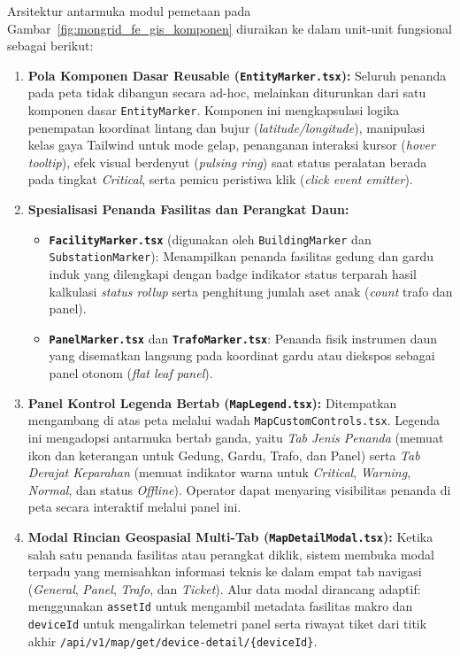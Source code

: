 Arsitektur antarmuka modul pemetaan pada Gambar~\ref{fig:mongrid_fe_gis_komponen} diuraikan ke dalam unit-unit fungsional sebagai berikut:
\begin{enumerate}[label=\arabic*., leftmargin=*, itemsep=0pt]
  \item \textbf{Pola Komponen Dasar Reusable (\texttt{EntityMarker.tsx}):} Seluruh penanda pada peta tidak dibangun secara ad-hoc, melainkan diturunkan dari satu komponen dasar \texttt{EntityMarker}. Komponen ini mengkapsulasi logika penempatan koordinat lintang dan bujur (\textit{latitude/longitude}), manipulasi kelas gaya Tailwind untuk mode gelap, penanganan interaksi kursor (\textit{hover tooltip}), efek visual berdenyut (\textit{pulsing ring}) saat status peralatan berada pada tingkat \textit{Critical}, serta pemicu peristiwa klik (\textit{click event emitter}).
  \item \textbf{Spesialisasi Penanda Fasilitas dan Perangkat Daun:} 
  \begin{itemize}[leftmargin=*, itemsep=0pt]
    \item \textbf{\texttt{FacilityMarker.tsx}} (digunakan oleh \texttt{BuildingMarker} dan \texttt{SubstationMarker}): Menampilkan penanda fasilitas gedung dan gardu induk yang dilengkapi dengan badge indikator status terparah hasil kalkulasi \textit{status rollup} serta penghitung jumlah aset anak (\textit{count} trafo dan panel).
    \item \textbf{\texttt{PanelMarker.tsx}} dan \textbf{\texttt{TrafoMarker.tsx}}: Penanda fisik instrumen daun yang disematkan langsung pada koordinat gardu atau diekspos sebagai panel otonom (\textit{flat leaf panel}).
  \end{itemize}
  \item \textbf{Panel Kontrol Legenda Bertab (\texttt{MapLegend.tsx}):} Ditempatkan mengambang di atas peta melalui wadah \texttt{MapCustomControls.tsx}. Legenda ini mengadopsi antarmuka bertab ganda, yaitu \textit{Tab Jenis Penanda} (memuat ikon dan keterangan untuk Gedung, Gardu, Trafo, dan Panel) serta \textit{Tab Derajat Keparahan} (memuat indikator warna untuk \textit{Critical}, \textit{Warning}, \textit{Normal}, dan status \textit{Offline}). Operator dapat menyaring visibilitas penanda di peta secara interaktif melalui panel ini.
  \item \textbf{Modal Rincian Geospasial Multi-Tab (\texttt{MapDetailModal.tsx}):} Ketika salah satu penanda fasilitas atau perangkat diklik, sistem membuka modal terpadu yang memisahkan informasi teknis ke dalam empat tab navigasi (\textit{General}, \textit{Panel}, \textit{Trafo}, dan \textit{Ticket}). Alur data modal dirancang adaptif: menggunakan \texttt{assetId} untuk mengambil metadata fasilitas makro dan \texttt{deviceId} untuk mengalirkan telemetri panel serta riwayat tiket dari titik akhir \texttt{/api/v1/map/get/device-detail/\{deviceId\}}.
\end{enumerate}

